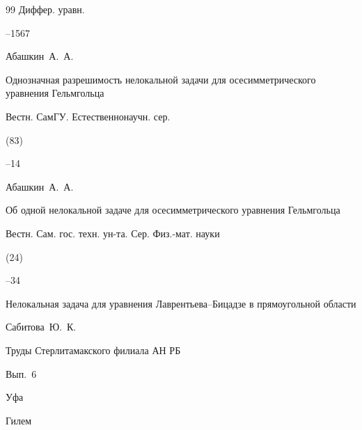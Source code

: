 \begin{thebibliography}{99}
\jour Диффер. уравн.




--1567








\by Абашкин~А.~А.

\paper Однозначная разрешимость нелокальной задачи для осесимметрического уравнения Гельмгольца

\jour Вестн. СамГУ. Естественнонаучн. сер.


(83)

--14





\by Абашкин~А.~А.

\paper Об одной нелокальной задаче для осесимметрического уравнения Гельмгольца

\jour Вестн. Сам. гос. техн. ун-та. Сер. Физ.-мат. науки


(24)

--34










\paper Нелокальная задача для уравнения Лаврентьева--Бицадзе в прямоугольной области

\by Сабитова~Ю.~К.

\inbook Труды Стерлитамакского филиала АН РБ

\volinfo Вып.~6

\publaddr Уфа

\publ Гилем


\end{thebibliography}
